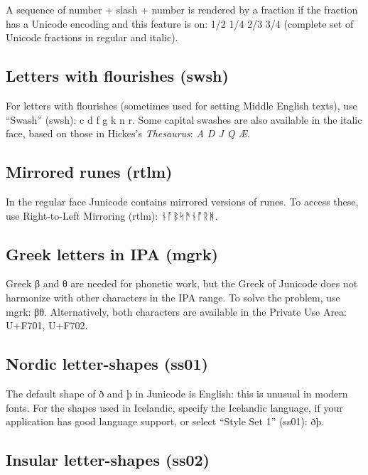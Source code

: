 \documentclass[12pt,a4paper,openany]{book}
\begin{document}
A sequence of number + slash + number is rendered by a fraction if the
fraction has a Unicode encoding and this feature is on:
{ 1/2 1/4 2/3 3/4} (complete set of Unicode
fractions in regular and italic).

\subsection*{Letters with flourishes (swsh)}
For letters with flourishes (sometimes used for setting Middle English
texts), use “Swash” (swsh):
{c d f g k n r}. Some capital swashes are also
available in the italic face, based on those in Hickes's \textit{Thesaurus}:
{\textit{A D J Q Æ}}.

\subsection*{Mirrored runes (rtlm)}

In the regular face Junicode
contains mirrored versions of runes. To access these, use
Right-to-Left Mirroring (rtlm): {
  ᚾᚪᛒᛋᚫᚾᚩᚱᚻ.}

\subsection*{Greek letters in IPA (mgrk)}

Greek β and θ are needed for phonetic work, but the Greek of Junicode
does not harmonize with other characters in the IPA range. To solve
the problem, use mgrk: {βθ}. Alternatively,
both characters are available in the Private Use Area: U+F701, U+F702.

\subsection*{Nordic letter-shapes (ss01)}

The default shape of ð and þ in Junicode is English: this is unusual in
modern fonts. For the shapes used in Icelandic, specify the Icelandic
language, if your application has good language support, or select
“Style Set 1” (ss01): { ðþ}.

\subsection*{Insular letter-shapes (ss02)}
\end{document}

